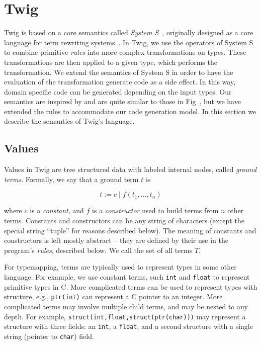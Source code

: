 
\section{Twig}
\label{sec:semantics}

Twig is based on a core semantics called \emph{System
S}~\cite{system-s}, originally designed as a core language for
term rewriting systems~\cite{baader98rewriting}. In Twig, we use
the operators of System S to combine primitive \emph{rules} into
more complex transformations on types. These transformations are
then applied to a given type, which performs the transformation.
We extend the semantics of System S in order to have the
evaluation of the transformation generate code as a side effect.
In this way, domain specific code can be generated depending on
the input types. Our semantics are inspired by and are quite
similar to those in Fig~\cite{fig}, but we have extended the rules
to accommodate our code generation model. In this section we
describe the semantics of Twig's language.

\subsection{Values}

Values in Twig are tree structured data with labeled internal nodes, called \emph{ground terms}. Formally, we say that a ground term $t$ is

\[
t \;\mbox{:=}\; c \;|\; f(t_1,\ldots,t_n)
\]

where $c$ is a \emph{constant}, and $f$ is a \emph{constructor} used to build terms from $n$ other terms. Constants and constructors can be any string of characters (except the special string ``tuple'' for reasons described below). The meaning of constants and constructors is left mostly abstract -- they are defined by their use in the program's \emph{rules}, described below. We call the set of all terms $T$.

For typemapping, terms are typically used to represent types in some other language. For example, we use constant terms, such \texttt{int} and \texttt{float} to represent primitive types in C. More complicated terms can be used to represent types with structure, e.g., \texttt{ptr(int)} can represent a C pointer to an integer. More complicated terms may involve multiple child terms, and may be nested to any depth. For example, \texttt{struct(int,float,struct(ptr(char)))} may represent a structure with three fields: an \texttt{int}, a \texttt{float}, and a second structure with a single string (pointer to \texttt{char}) field.

